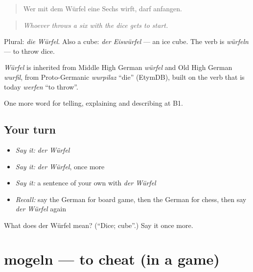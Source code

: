 \begin{quote}
Wer mit dem Würfel eine Sechs wirft, darf anfangen.
\end{quote}

\begin{quote}
\emph{Whoever throws a six with the dice gets to start.}
\end{quote}

Plural: \emph{die Würfel}. Also a cube: \emph{der Eiswürfel} — an ice cube. The verb is \emph{würfeln} — to throw dice.

\begin{cousinweb}
\emph{Würfel} is inherited from Middle High German \emph{würfel} and Old High German \emph{wurfil}, from Proto-Germanic \emph{wurpilaz} \textquotedblleft{}die\textquotedblright{} (EtymDB), built on the verb that is today \emph{werfen} \textquotedblleft{}to throw\textquotedblright{}.
\end{cousinweb}

\begin{grammarlens}[title={What you've built}]
One more word for telling, explaining and describing at B1.
\end{grammarlens}

\subsection*{Your turn}
\begin{itemize}
\raggedright
  \item \emph{Say it:} \emph{der Würfel}
  \item \emph{Say it:} \emph{der Würfel}, once more
  \item \emph{Say it:} a sentence of your own with \emph{der Würfel}
  \item \emph{Recall:} say the German for board game, then the German for chess, then say \emph{der Würfel} again
\end{itemize}

\begin{tcolorbox}[breakable,colback=teal!4,colframe=teal!35!black,title={Before you move on}]
What does der Würfel mean? (\textquotedblleft{}Dice; cube\textquotedblright{}.) Say it once more.
\end{tcolorbox}
\section[mogeln]{mogeln — to cheat (in a game)}

\label{lesson:GE-C501-mogeln}



